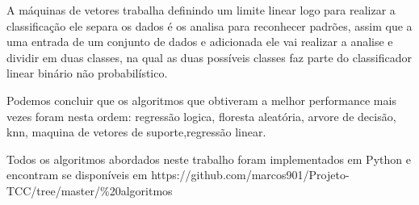A máquinas de vetores trabalha definindo um limite linear logo para realizar a classificação ele separa os dados é os analisa para reconhecer padrões, assim que a uma entrada de um conjunto de dados e adicionada ele vai realizar a analise e dividir em duas classes, na qual as duas possíveis classes faz parte do classificador linear binário não probabilístico.

Podemos concluir que os algoritmos que obtiveram a melhor performance mais vezes foram
nesta ordem: regressão logica, floresta aleatória, arvore de decisão, knn, maquina de vetores de suporte,regressão linear. 

Todos os algoritmos abordados neste trabalho foram implementados em Python e encontram se disponíveis em https://github.com/marcos901/Projeto-TCC/tree/master/\%20algoritmos





